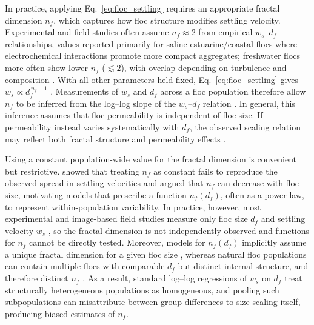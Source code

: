 \documentclass{agujournal2019}
\begin{document}
In practice, applying Eq.~\eqref{eq:floc_settling} requires an appropriate fractal dimension $n_f$, which captures how floc structure modifies settling velocity. Experimental and field studies often assume $n_f \approx 2$ from empirical $w_s$–$d_f$ relationships, values reported primarily for saline estuarine/coastal flocs where electrochemical interactions promote more compact aggregates; freshwater flocs more often show lower $n_f$ ($\lesssim 2$), with overlap depending on turbulence and composition \cite{winterwerp1998simple, winterwerp2006heuristic}. With all other parameters held fixed, Eq.~\eqref{eq:floc_settling} gives $w_s \propto d_f^{\,n_f-1}$ \cite{johnson1996settling, li1989fractal}. Measurements of $w_s$ and $d_f$ across a floc population therefore allow $n_f$ to be inferred from the log–log slope of the $w_s$–$d_f$ relation \cite{kranenburg1994fractal, strom2011explicit, winterwerp1998simple, winterwerp2002flocculation, winterwerp2004introduction, winterwerp2006heuristic}. In general, this inference assumes that floc permeability is independent of floc size. If permeability instead varies systematically with $d_f$, the observed scaling relation may reflect both fractal structure and permeability effects \cite{strom2011explicit, nghiem2026flocculated}.

Using a constant population-wide value for the fractal dimension is convenient but restrictive.  showed that treating $n_f$ as constant fails to reproduce the observed spread in settling velocities and argued that $n_f$ can decrease with floc size, motivating models that prescribe a function $n_f(d_f)$, often as a power law, to represent within-population variability. In practice, however, most experimental and image-based field studies measure only floc size $d_f$ and settling velocity $w_s$ \cite{smith2015image, nghiem2024testing}, so the fractal dimension is not independently observed and functions for $n_f$ cannot be directly tested. Moreover, models for $n_f(d_f)$ implicitly assume a unique fractal dimension for a given floc size \cite{khelifa2006models}, whereas natural floc populations can contain multiple flocs with comparable $d_f$ but distinct internal structure, and therefore distinct $n_f$ \cite{maggi2007variable}. As a result, standard log–log regressions of $w_s$ on $d_f$ treat structurally heterogeneous populations as homogeneous, and pooling such subpopulations can misattribute between-group differences to size scaling itself, producing biased estimates of $n_f$.
\end{document}
